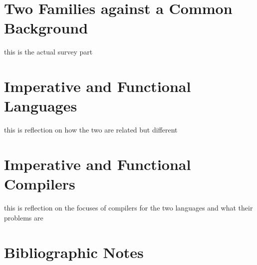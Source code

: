 \label{conclusion:back}
\section{Two Families against a Common Background}
this is the actual survey part

\section{Imperative and Functional Languages}
this is reflection on how the two are related but different

\section{Imperative and Functional Compilers}
this is reflection on the focuses of compilers for the two languages and what their problems are

\section{Bibliographic Notes}
